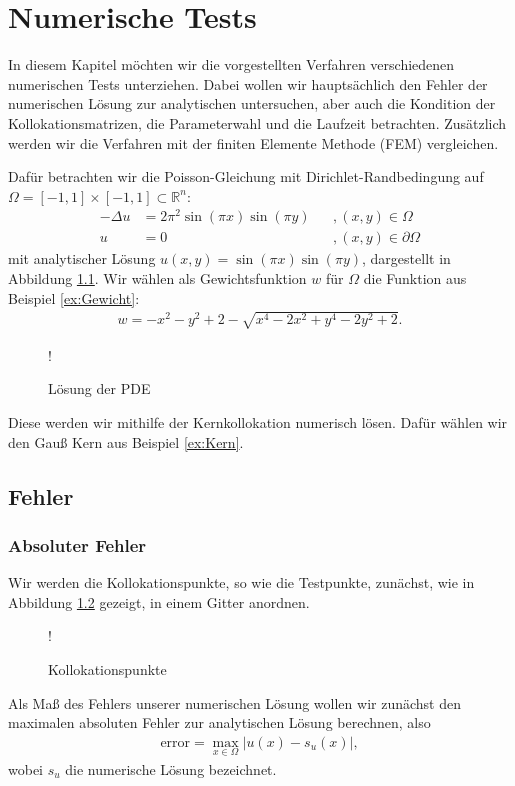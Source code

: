 \chapter{Numerische Tests}
\label{cha:NumerischeTests}

In diesem Kapitel möchten wir die vorgestellten Verfahren verschiedenen numerischen Tests unterziehen. Dabei wollen wir hauptsächlich den Fehler der numerischen Lösung zur analytischen untersuchen, aber auch die Kondition der Kollokationsmatrizen, die Parameterwahl und die Laufzeit betrachten. Zusätzlich werden wir die Verfahren mit der finiten Elemente Methode (\acs{FEM}) vergleichen.

Dafür betrachten wir die Poisson-Gleichung mit Dirichlet-Randbedingung auf $\Omega = [-1,1] \times [-1,1] \subset \mathbb{R}^n$:
\begin{align*}
- \Delta u &= 2\pi^2 \sin(\pi x)\sin(\pi y)&&, (x,y) \in \Omega\\
u &= 0&&, (x,y) \in \partial \Omega
\end{align*}
mit analytischer Lösung $u(x,y) = \sin(\pi x)\sin(\pi y)$, dargestellt in Abbildung \ref{fig:plot}. Wir wählen als Gewichtsfunktion $w$ für $\Omega$ die Funktion aus Beispiel \ref{ex:Gewicht}:
\begin{align*}
w = -x^2-y^2+2 - \sqrt{x^4 -2x^2 + y^4 -2y^2+2}.
\end{align*}
\begin{figure}[h]
\centering
\resizebox {\columnwidth} {!} {

}
\caption{Lösung der \ac{PDE}}
\label{fig:plot}
\end{figure}

Diese werden wir mithilfe der Kernkollokation numerisch lösen. Dafür wählen wir den Gauß Kern aus Beispiel \ref{ex:Kern}.

\section{Fehler}
\subsection{Absoluter Fehler}

Wir werden die Kollokationspunkte, so wie die Testpunkte, zunächst, wie in Abbildung \ref{fig:Kollok} gezeigt, in einem Gitter anordnen.
\begin{figure}[h]
\centering
\resizebox {.8\columnwidth} {!} {

}
\caption{Kollokationspunkte}
\label{fig:Kollok}
\end{figure}
Als Maß des Fehlers unserer numerischen Lösung wollen wir zunächst den maximalen absoluten Fehler zur analytischen Lösung berechnen, also
\begin{align*}
\text{error} = \max_{x \in \Omega} |u(x) - s_u (x)|,
\end{align*}
wobei $s_u$ die numerische Lösung bezeichnet.

